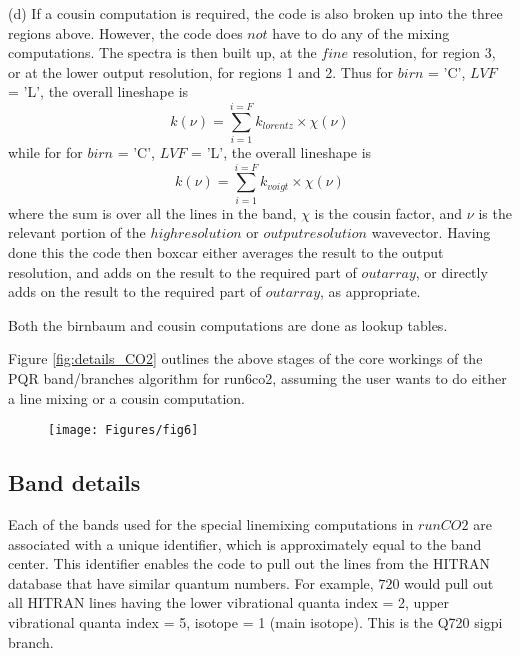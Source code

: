 \documentclass[11pt]{article}
\begin{document}
(d) If a cousin computation is required, the code is also broken up into the
    three regions above. However, the code does $not$ have to do any of the
    mixing computations. The spectra is then built up, at the $fine$
    resolution, for region 3, or at the lower output resolution, for 
    regions 1 and 2. Thus for $birn$ = 'C', $LVF$ = 'L', the overall 
    lineshape is
\begin{equation}
k(\nu) = \sum_{i=1}^{i=F} k_{lorentz} \times \chi(\nu)
\end{equation}
    while for for $birn$ = 'C', $LVF$ = 'L', the overall lineshape is
\begin{equation}
k(\nu) = \sum_{i=1}^{i=F} k_{voigt} \times \chi(\nu)
\end{equation}
    where the sum is over all the lines in the band, $\chi$ is the cousin 
    factor, and $\nu$ is the relevant portion of the $high resolution$ or 
    $output resolution$ wavevector. 
    Having done this the code then boxcar either averages the result to 
    the output resolution, and adds on the result to the required part of 
    $outarray$, or directly adds on the result to the required part of 
    $outarray$, as appropriate.

Both the birnbaum and cousin computations are done as lookup tables.

Figure \ref{fig:details_CO2} outlines the above stages of the core workings 
of the PQR band/branches algorithm for run6co2, assuming the user wants to 
do either a line mixing or a cousin computation.

\begin{figure}
  \begin{center}\texttt{[image: Figures/fig6]}\end{center}
  \caption[Core PQR band details for CO2]{}
  \label{fig:PQRloop_CO2}
\end{figure}

\subsection{Band details}
Each of the bands used for the special linemixing computations in $runCO2$ 
are associated with a unique identifier, which is approximately equal to the
band center. This identifier enables the code to pull out the lines from 
the HITRAN database that have similar quantum numbers. For example, $720$ 
would pull out all HITRAN lines having the lower vibrational quanta 
index = 2, upper vibrational quanta index = 5,  isotope = 1 (main isotope).
This is the Q720 sigpi branch.
\end{document}
